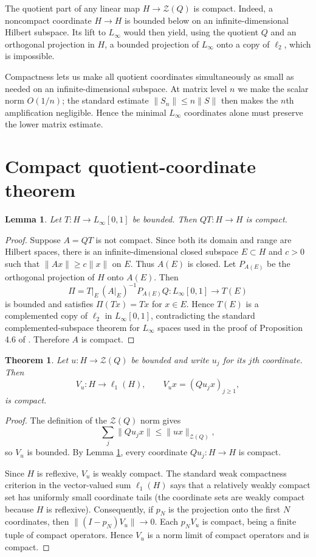 \documentclass[11pt]{article}
\newtheorem{theorem}{Theorem}
\newtheorem{lemma}{Lemma}
\newcommand{\cZ}{\mathcal Z}
\begin{document}
The quotient part of any linear map $H\to\cZ(Q)$ is compact.  Indeed, a
noncompact coordinate $H\to H$ is bounded below on an infinite-dimensional
Hilbert subspace.  Its lift to $L_\infty$ would then yield, using the quotient
$Q$ and an orthogonal projection in $H$, a bounded projection of $L_\infty$
onto a copy of $\ell_2$, which is impossible.

Compactness lets us make all quotient coordinates simultaneously as small as
needed on an infinite-dimensional subspace.  At matrix level $n$ we make the
scalar norm $O(1/n)$; the standard estimate $\|S_n\|\leq n\|S\|$ then makes
the $n$th amplification negligible.  Hence the minimal $L_\infty$
coordinates alone must preserve the lower matrix estimate.

\section{Compact quotient-coordinate theorem}

\begin{lemma}\label{lem:coordinate}
Let $T:H\to L_\infty[0,1]$ be bounded.  Then $QT:H\to H$ is compact.
\end{lemma}

\begin{proof}
Suppose $A=QT$ is not compact.  Since both its domain and range are Hilbert
spaces, there is an infinite-dimensional closed subspace $E\subset H$ and
$c>0$ such that $\|Ax\|\geq c\|x\|$ on $E$.  Thus $A(E)$ is closed.  Let
$P_{A(E)}$ be the orthogonal projection of $H$ onto $A(E)$.  Then
\[
 \Pi=T|_E\,(A|_E)^{-1}P_{A(E)}Q:L_\infty[0,1]\longrightarrow T(E)
\]
is bounded and satisfies $\Pi(Tx)=Tx$ for $x\in E$.  Hence $T(E)$ is a
complemented copy of $\ell_2$ in $L_\infty[0,1]$, contradicting the standard
complemented-subspace theorem for $L_\infty$ spaces used in the proof of
Proposition 4.6 of \cite{Braga2021}.  Therefore $A$ is compact.
\end{proof}

\begin{theorem}\label{thm:compact}
Let $u:H\to\cZ(Q)$ be bounded and write $u_j$ for its $j$th coordinate.
Then
\[
 V_u:H\longrightarrow\ell_1(H),\qquad
 V_ux=(Qu_jx)_{j\geq1},
\]
is compact.
\end{theorem}

\begin{proof}
The definition of the $\cZ(Q)$ norm gives
\[
 \sum_j\|Qu_jx\|\leq\|ux\|_{\cZ(Q)},
\]
so $V_u$ is bounded.  By Lemma \ref{lem:coordinate}, every coordinate
$Qu_j:H\to H$ is compact.

Since $H$ is reflexive, $V_u$ is weakly compact.  The standard weak
compactness criterion in the vector-valued sum $\ell_1(H)$ says that a
relatively weakly compact set has uniformly small coordinate tails (the
coordinate sets are weakly compact because $H$ is reflexive).  Consequently,
if $p_N$ is the projection onto the first $N$ coordinates, then
$\|(I-p_N)V_u\|\to0$.  Each $p_NV_u$ is compact, being a finite tuple of
compact operators.  Hence $V_u$ is a norm limit of compact operators and is
compact.
\end{proof}
\end{document}
